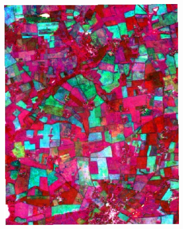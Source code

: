 \documentclass[journal,article,submit,pdftex,moreauthors]{Definitions/mdpi}
\providecommand{\DIFaddbeginFL}{} %
\providecommand{\DIFaddendFL}{} %
\providecommand{\DIFdelbeginFL}{} %
\providecommand{\DIFdelendFL}{} %
\begin{document}
\begin{figure}[H]
\begin{subfigure}[t]{0.23\linewidth}
    \DIFaddendFL \caption{}
	\DIFdelbeginFL %
\DIFdelendFL \DIFaddbeginFL \label{fig:color_map_e}
	\DIFaddendFL \end{subfigure}
    \begin{subfigure}[t]{0.23\linewidth}
		\centering
	\DIFdelbeginFL %
\DIFdelendFL \DIFaddbeginFL \includegraphics[height=\linewidth,width=0.95\linewidth]{figures/aes_1_layer_mse_results/composites/composite_image_201032.pdf}
    \DIFaddendFL \caption{}
	\DIFdelbeginFL %
\DIFdelendFL \DIFaddbeginFL \label{fig:color_map_f}
	\DIFaddendFL \end{subfigure}
    \begin{subfigure}[t]{0.23\linewidth}
		\centering
	\DIFdelbeginFL %

\end{subfigure}
\end{figure}
\end{document}
